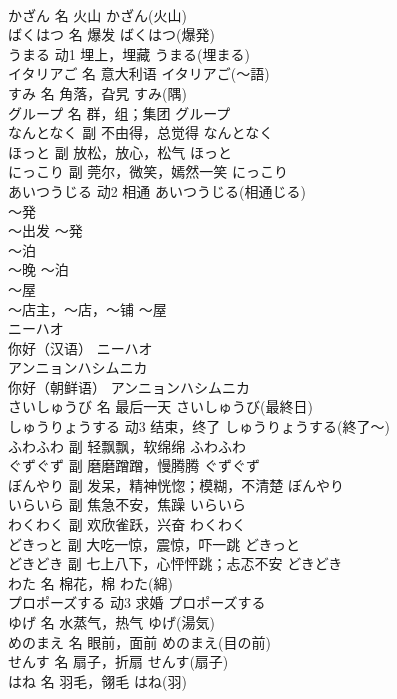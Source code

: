 \documentclass[8pt]{extreport}
\begin{document}
\begin{CJK}{UTF8}{min}
\\	かざん	名	火山	かざん(火山)	
\\	ばくはつ	名	爆发	ばくはつ(爆発)	
\\	うまる	动1	埋上，埋藏	うまる(埋まる)	
\\	イタリアご	名	意大利语	イタリアご(～語)	
\\	すみ	名	角落，旮旯	すみ(隅)	
\\	グループ	名	群，组；集团	グループ	
\\	なんとなく	副	不由得，总觉得	なんとなく	
\\	ほっと	副	放松，放心，松气	ほっと	
\\	にっこり	副	莞尔，微笑，嫣然一笑	にっこり	
\\	あいつうじる	动2	相通	あいつうじる(相通じる)	
\\	～発	
\\	～出发	～発	
\\	～泊	
\\	～晚	～泊	
\\	～屋	
\\	～店主，～店，～铺	～屋	
\\	ニーハオ	
\\	你好（汉语）	ニーハオ	
\\	アンニョンハシムニカ	
\\	你好（朝鲜语）	アンニョンハシムニカ	
\\	さいしゅうび	名	最后一天	さいしゅうび(最終日)	
\\	しゅうりょうする	动3	结束，终了	しゅうりょうする(終了～)	
\\	ふわふわ	副	轻飘飘，软绵绵	ふわふわ	
\\	ぐずぐず	副	磨磨蹭蹭，慢腾腾	ぐずぐず	
\\	ぼんやり	副	发呆，精神恍惚；模糊，不清楚	ぼんやり	
\\	いらいら	副	焦急不安，焦躁	いらいら	
\\	わくわく	副	欢欣雀跃，兴奋	わくわく	
\\	どきっと	副	大吃一惊，震惊，吓一跳	どきっと	
\\	どきどき	副	七上八下，心怦怦跳；忐忑不安	どきどき	
\\	わた	名	棉花，棉	わた(綿)	
\\	プロポーズする	动3	求婚	プロポーズする	
\\	ゆげ	名	水蒸气，热气	ゆげ(湯気)	
\\	めのまえ	名	眼前，面前	めのまえ(目の前)	
\\	せんす	名	扇子，折扇	せんす(扇子)	
\\	はね	名	羽毛，翎毛	はね(羽)	

\end{CJK}
\end{document}
